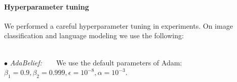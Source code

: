 \documentclass{article}
\begin{document}
\paragraph{Hyperparameter tuning} We performed a careful hyperparameter tuning in experiments. On image classification and language modeling we use the following: \\
\begin{table}[]
\centering
\caption{Top-1 accuracy of ResNet18 on ImageNet. $\dag$ is reported in \cite{chen2018closing}, $\ddag$ is reported in \cite{liu2019variance}}
\label{table:imagenet}
\end{table}\\
$\bullet$ \textit{AdaBelief:}\ \ \ \ We use the default parameters of Adam: $\beta_1=0.9, \beta_2=0.999, \epsilon = 10^{-8}, \alpha = 10^{-3}$. %
\\
\end{document}
